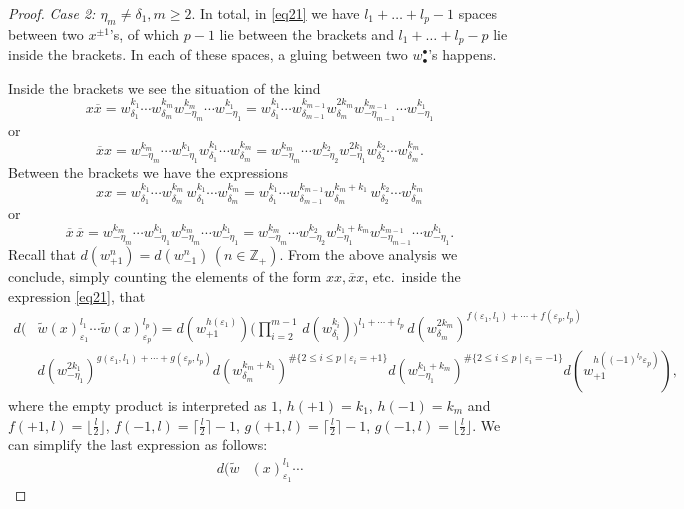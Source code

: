 \documentclass[11 pt, leqno]{amsart}
\newcommand{\eps}{\varepsilon}
\newcommand{\ov}{\overline}
\newcommand{\ZZ}{\mathbb{Z}}
\theoremstyle{definition}
\numberwithin{equation}{section}
\begin{document}
\begin{proof}
\emph{Case 2: $\eta_m\neq \delta_1, m\ge 2$}.
In total, in \eqref{eq21} we have
$l_1+\dotsc+l_p -1$ spaces between two $x^{\pm 1}$'s, of which  $p-1$ lie between the brackets and $l_1+\dotsc+l_p-p$ lie inside the brackets. In each of these spaces, a gluing between two $w^\bullet_\bullet$'s happens.

Inside the brackets we see the situation of the kind
\[
x \ov{x}=
w^{k_1}_{\delta_1}\cdots w^{k_m}_{\delta_m}
w^{k_m}_{-\eta_m} \cdots
w^{k_1}_{-\eta_1}=
w^{k_1}_{\delta_1}\cdots w^{k_{m-1}}_{\delta_{m-1}} w^{2 k_m}_{\delta_m}
w^{k_{m-1}}_{-\eta_{m-1}} \cdots
w^{k_1}_{-\eta_1}
\]
or
\[
\ov{x} x =
w^{k_m}_{-\eta_m} \cdots
w^{k_1}_{-\eta_1}
w^{k_1}_{\delta_1}\cdots w^{k_m}_{\delta_m}=
w^{k_m}_{-\eta_m} \cdots
w^{k_2}_{-\eta_2}
w^{2 k_1}_{-\eta_1}
w^{k_2}_{\delta_2}\cdots w^{k_m}_{\delta_m}.
\]
 Between the brackets we have the expressions
\[
xx=w^{k_1}_{\delta_1}\cdots w^{k_m}_{\delta_m}\,
w^{k_1}_{\delta_1}\cdots w^{k_m}_{\delta_m}=
w^{k_1}_{\delta_1}\cdots w^{k_{m-1}}_{\delta_{m-1}}w^{ k_m+k_1}_{\delta_m}\,
w^{k_2}_{\delta_2} \cdots w^{k_m}_{\delta_m}
\]
or 
\[
\ov{x}\, \ov{x} = 
w^{k_m}_{-\eta_m} \cdots
w^{k_1}_{-\eta_1}
w^{k_m}_{-\eta_m} \cdots
w^{k_1}_{-\eta_1}=
w^{k_m}_{-\eta_m} \cdots w^{k_2}_{-\eta_2}
w^{k_1+k_m }_{-\eta_1}
w^{k_{m-1}}_{-\eta_{m-1}} \cdots 
w^{k_1}_{-\eta_1}.
\]
Recall that $d(w^n_{+1})=d(w^n_{-1})\,(n\in\ZZ_+)$. From the above analysis  we conclude, simply counting the elements of the form $xx,  \ov{x} x$, etc.\ inside the expression \eqref{eq21}, that 
\begin{align*}
d( 
&\widetilde{w}(x)^{l_1}_{\eps_1}\cdots
\widetilde{w}(x)^{l_p}_{\eps_p})=
d(w^{h(\eps_1)}_{+1}) \bigl( \prod_{i=2}^{m-1}\, d(w^{k_i}_{\delta_i})\bigr)^{l_1+\cdots + l_p}\,
d(w^{2k_m}_{\delta_m})^{f(\eps_1,l_1)+\cdots+
f(\eps_p,l_p)}
\\
&
d(w^{2k_1}_{-\eta_1})^{g(\eps_1,l_1)+\cdots+
	g(\eps_p,l_p)}
d(w^{k_m+k_1}_{\delta_m})^{ \#\{2 \le i\le p\mid \eps_i=+1\}}
d(w^{k_1+k_m}_{-\eta_1})^{ \#\{2 \le i \le p\mid \eps_i=-1\}}d(w^{h((-1)^{l_p}\eps_p)}_{+1}),
\end{align*}
where the empty product is interpreted as $1$, $h(+1)=k_1$, $h(-1)=k_m$ and $f(+1,l)=\lfloor \tfrac{l}{2}\rfloor$, $f(-1,l)=\lceil \tfrac{l}{2}\rceil -1$, $g(+1, l)=\lceil \tfrac{l}{2}\rceil -1$, $g(-1,l)=\lfloor \tfrac{l}{2}\rfloor$. We can simplify the last expression as follows:
\begin{align*}
d( 
\widetilde{w}&(x)^{l_1}_{\eps_1}\cdots

\end{align*}
\end{proof}
\end{document}
